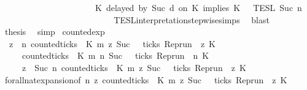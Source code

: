 \begin{isabellebody}
\ \ \ \ \ \ \ \ \ \ \ \ \ \ \ \ \ \ \ \ \ {\isacharhash}\ {\isacharparenleft}K\ delayed\ by\ {\isacharparenleft}Suc\ d{\isacharparenright}\ on\ K\ implies\ K\ {\isacharhash}\ {\isasymPhi}\ {\isasymrbrakk}{\isasymrbrakk}\isactrlsub T\isactrlsub E\isactrlsub S\isactrlsub L\isactrlbsup {\isasymge}\ Suc\ n\isactrlesup \isanewline
\ \ \ \ \ \ \ \ \ \ \ \ \ \ \ \ \ \ \ \ {\isacharparenright}{\isacartoucheclose}\isanewline
\ \ \ \ \isamarkupfalse%
\ TESL{\isacharunderscore}interpretation{\isacharunderscore}stepwise{\isachardot}simps{\isacharparenleft}{}{\isacharparenright}\ \isamarkupfalse%
\ blast\isanewline
\ \ \isamarkupfalse%
\ \isamarkupfalse%
\ {\isacharquery}thesis\ \isamarkupfalse%
\ simp\isanewline
{}\isamarkupfalse%
%
\endisatagproof
{\isafoldproof}%
%
\isadelimproof
\isanewline
%
\endisadelimproof
\isanewline
{}\isamarkupfalse%
\ counted{\isacharunderscore}exp{\isacharcolon}\isanewline
\ \ {\isacartoucheopen}{\isacharparenleft}{\isasymforall}z\ {\isasymge}\ n{\isachardot}\ counted{\isacharunderscore}ticks\ {\isasymrho}\ K\ m\ z\ {\isacharparenleft}Suc\ {}{\isacharparenright}\ {\isasymlongrightarrow}\ ticks\ {\isacharparenleft}{\isacharparenleft}Rep{\isacharunderscore}run\ {\isasymrho}{\isacharparenright}\ z\ K{\isacharprime}{\isacharparenright}{\isacharparenright}\isanewline
\ \ \ \ {\isacharequal}\ {\isacharparenleft}{\isacharparenleft}counted{\isacharunderscore}ticks\ {\isasymrho}\ K\ m\ n\ {\isacharparenleft}Suc\ {}{\isacharparenright}\ {\isasymlongrightarrow}\ ticks\ {\isacharparenleft}{\isacharparenleft}Rep{\isacharunderscore}run\ {\isasymrho}{\isacharparenright}\ n\ K{\isacharprime}{\isacharparenright}{\isacharparenright}\isanewline
\ \ \ \ {\isasymand}\ {\isacharparenleft}{\isasymforall}z\ {\isasymge}\ Suc\ n{\isachardot}\ counted{\isacharunderscore}ticks\ {\isasymrho}\ K\ m\ z\ {\isacharparenleft}Suc\ {}{\isacharparenright}\ {\isasymlongrightarrow}\ ticks\ {\isacharparenleft}{\isacharparenleft}Rep{\isacharunderscore}run\ {\isasymrho}{\isacharparenright}\ z\ K{\isacharprime}{\isacharparenright}{\isacharparenright}{\isacharparenright}{\isacartoucheclose}\isanewline
%
\isadelimproof
%
\endisadelimproof
%
\isatagproof
{}\isamarkupfalse%
\ forall{\isacharunderscore}nat{\isacharunderscore}expansion{\isacharbrackleft}of\ {\isacartoucheopen}n{\isacartoucheclose}\ {\isacartoucheopen}{\isasymlambda}z{\isachardot}\ counted{\isacharunderscore}ticks\ {\isasymrho}\ K\ m\ z\ {\isacharparenleft}Suc\ {}{\isacharparenright}\ {\isasymlongrightarrow}\ ticks\ {\isacharparenleft}Rep{\isacharunderscore}run\ {\isasymrho}\ z\ K{\isacharprime}{\isacharparenright}{\isacartoucheclose}{\isacharbrackright}\ \isacommand{{\isachardot}}\isamarkupfalse%

\end{isabellebody}
